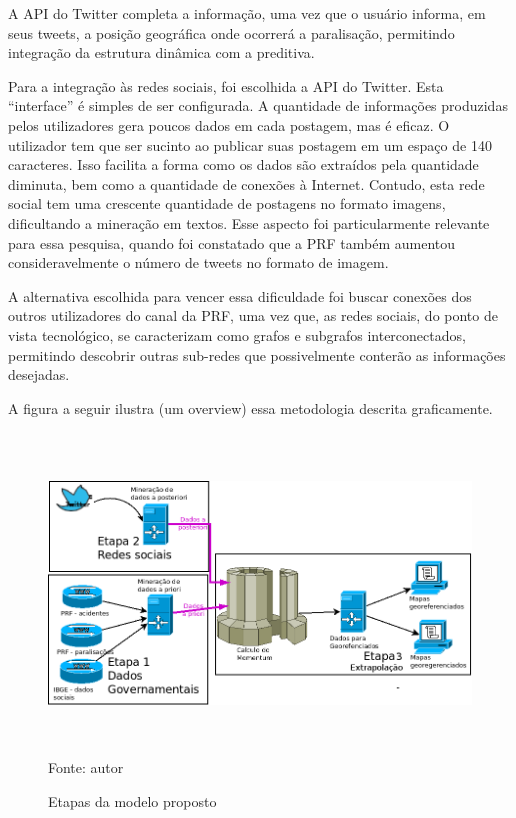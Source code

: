 A API do Twitter completa a informação, uma vez que o usuário informa, em seus tweets, a posição geográfica onde ocorrerá a paralisação, permitindo integração da estrutura
dinâmica com a preditiva.

Para a integração às redes sociais, foi escolhida a API do Twitter. Esta ``interface'' é simples de ser configurada. A quantidade de informações produzidas pelos utilizadores gera poucos dados em cada postagem, mas é eficaz. O utilizador tem que ser sucinto ao publicar suas postagem em um espaço de 140 caracteres. Isso facilita a forma como os dados são extraídos pela quantidade diminuta, bem como a quantidade de conexões à Internet. Contudo, esta rede social tem uma crescente quantidade de postagens no formato imagens, dificultando a mineração em textos. Esse aspecto foi particularmente relevante para essa pesquisa, quando foi constatado que a PRF também aumentou consideravelmente o número de tweets no formato de imagem. 

A alternativa escolhida para vencer essa dificuldade foi buscar conexões dos outros utilizadores do canal da PRF, uma vez que, as redes sociais, do ponto de vista tecnológico, se caracterizam como grafos e subgrafos interconectados, permitindo descobrir outras sub-redes que possivelmente conterão as informações desejadas. 

A figura a seguir ilustra (um overview) essa metodologia descrita graficamente.

\pagebreak

\begin{figure}[ht]
\centering
\caption{Etapas da modelo proposto}
\includegraphics[width=170mm, height=85mm]{Figuras/Metodologia/metodologiaGeral.png}\\
\tiny Fonte: autor
\end{figure}

